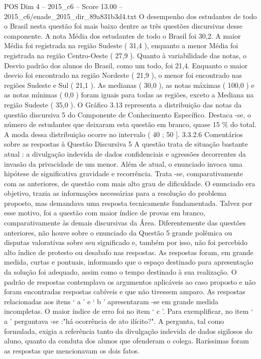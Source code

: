 \begin{textsample}{POS Dim 4 – 2015\_c6 – Score 13.00 – 2015\_c6/enade\_2015\_dir\_89a831b3d4.txt}
O desempenho dos estudantes de todo o Brasil nesta questão foi mais baixo dentre as três questões discursivas desse componente.
A nota Média dos estudantes de todo o Brasil foi 30,2.
A maior Média foi registrada na região Sudeste ( 31,4 ), enquanto a menor Média foi registrada na região Centro-Oeste ( 27,9 ).
Quanto à variabilidade das notas, o Desvio padrão dos alunos do Brasil, como um todo, foi 21,4.
Enquanto o maior desvio foi encontrado na região Nordeste ( 21,9 ), o menor foi encontrado nas regiões Sudeste e Sul ( 21,1 ).
As medianas ( 30,0 ), as notas máximas ( 100,0 ) e as notas mínimas ( 0,0 ) foram iguais para todas as regiões, exceto a Mediana na região Sudeste ( 35,0 ).
O Gráfico 3.13 representa a distribuição das notas da questão discursiva 5 do Componente de Conhecimento Específico.
Destaca -se, o número de estudantes que deixaram esta questão em branco, quase 15 \% do total.
A moda dessa distribuição ocorre no intervalo ( 40 ; 50 ]. 3.3.2.6 Comentários sobre as respostas à Questão Discursiva 5 A questão trata de situação bastante atual : a divulgação indevida de dados confidenciais e agressões decorrentes da invasão da privacidade de um menor.
Além de atual, o enunciado invoca uma hipótese de significativa gravidade e recorrência.
Trata -se, comparativamente com as anteriores, de questão com mais alto grau de dificuldade.
O enunciado era objetivo, trazia as informações necessárias para a resolução do problema proposto, mas demandava uma resposta tecnicamente fundamentada.
Talvez por esse motivo, foi a questão com maior índice de provas em branco, comparativamente às demais discursivas da Área.
Diferentemente das questões anteriores, não houve sobre o enunciado da Questão 5 grande polêmica ou disputas valorativas sobre seu significado e, também por isso, não foi percebido alto índice de protesto ou desabafo nas respostas.
As respostas foram, em grande medida, curtas e pontuais, informando que o espaço destinado para apresentação da solução foi adequado, assim como o tempo destinado à sua realização.
O padrão de respostas contemplava os argumentos aplicáveis ao caso proposto e não foram encontradas respostas cabíveis e que não tivessem amparo.
As respostas relacionadas aos itens ‘ a ’ e ‘ b ’ apresentaram -se em grande medida incompletas.
O maior índice de erro foi no item ‘ c ’.
Para exemplificar, no item ‘ a ’ perguntava -se :"há ocorrência de ato ilícito?".
A pergunta, tal como formulada, exigia a referência tanto da divulgação indevida de dados sigilosos do aluno, quanto da conduta dos alunos que ofenderam o colega.
Raríssimas foram as respostas que mencionavam os dois fatos.

\end{textsample}
